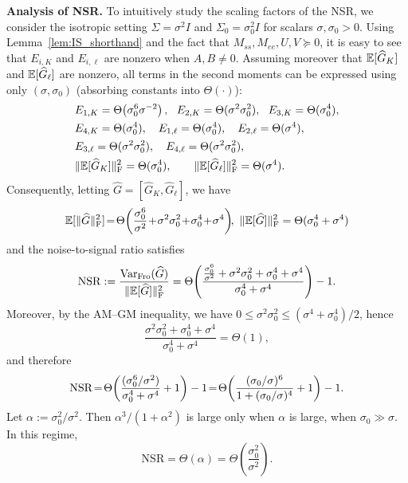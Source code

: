 \textbf{Analysis of NSR.}
To intuitively study the scaling factors of the NSR, we consider the isotropic setting $\Sigma=\sigma^2 I$ and $\Sigma_0=\sigma_0^2 I$ for scalars $\sigma,\sigma_0>0$.
Using Lemma~\ref{lem:IS_shorthand} and the fact that $M_{ss}, M_{ee}, U, V\succeq 0$, it is easy to see that $E_{i,K}$ and $E_{i,\ell}$ are nonzero when $A,B\neq 0$.
Assuming moreover that ${\mathbb{E}}[\widehat G_K]$ and ${\mathbb{E}}[\widehat G_\ell]$ are nonzero, all terms in the second moments can be expressed using only $(\sigma,\sigma_0)$ (absorbing constants into $\Theta(\cdot)$):
\begin{align*}
  &E_{1,K}=\Theta\!\left(\sigma_0^{6}\sigma^{-2}\right),\ \ 
  E_{2,K}=\Theta(\sigma^{2}\sigma_0^{2}),\ \ 
  E_{3,K}=\Theta(\sigma_0^{4}),\\
  &E_{4,K}=\Theta(\sigma_0^{4}),\quad
  E_{1,\ell}=\Theta(\sigma_0^{4}),\quad
  E_{2,\ell}=\Theta(\sigma^{4}),\\
  &E_{3,\ell}=\Theta(\sigma^{2}\sigma_0^{2}),\quad
  E_{4,\ell}=\Theta(\sigma^{2}\sigma_0^{2}),\\
  &\|\E[\widehat G_K]\|_{\mathrm F}^2=\Theta(\sigma_0^{4}),\qquad
  \|\E[\widehat G_\ell]\|_{\mathrm F}^2=\Theta(\sigma^{4}).
\end{align*}
Consequently, letting $\widehat G = [\widehat G_K, \widehat G_\ell]$, we have
\[
\E[\|\widehat G\|_{\mathrm F}^2]
\!=\!\Theta\!\left(\frac{\sigma_0^{6}}{\sigma^{2}}\!+\!\sigma^{2}\sigma_0^{2}\!+\!\sigma_0^{4}\!+\!\sigma^{4}\right)\!\!,
\
\|\E[\widehat G]\|_{\mathrm F}^2=\Theta(\sigma_0^{4}+\sigma^{4})
\]
and the noise-to-signal ratio satisfies
\[
\vspace{-2mm}
\mathrm{NSR}:=\frac{\VarF(\widehat G)}{\|\E[\widehat G]\|_{\mathrm F}^2}
=\Theta\!\left(\frac{\frac{\sigma_0^{6}}{\sigma^{2}}+\sigma^{2}\sigma_0^{2}+\sigma_0^{4}+\sigma^{4}}{\sigma_0^{4}+\sigma^{4}}\right)-1.
\]
Moreover, by the AM--GM inequality, we have $0\le \sigma^{2}\sigma_0^{2}\le (\sigma^{4}+\sigma_0^{4})/2$, hence
\[
\frac{\sigma^{2}\sigma_0^{2}+\sigma_0^{4}+\sigma^{4}}{\sigma_0^{4}+\sigma^{4}}=\Theta(1),
\]
and therefore
\[
\vspace{-2mm}
\mathrm{NSR}
\!=\!\Theta\!\left(\frac{(\sigma_0^{6}/\sigma^{2})}{\sigma_0^{4}+\sigma^{4}}+1\right)-1
\!=\!\Theta\!\left(\frac{(\sigma_0/\sigma)^{6}}{1+(\sigma_0/\sigma)^{4}}+1\right)-1.
\]
Let $\alpha:=\sigma_0^2/\sigma^2$. Then $\alpha^{3}/(1+\alpha^{2})$ is large only when $\alpha$ is large, \ie when $\sigma_0 \gg \sigma$. In this regime,
\begin{equation}\label{eq:lqr-nsr-scaling}
\mathrm{NSR}=\Theta(\alpha)=\Theta\!\left(\frac{\sigma_0^{2}}{\sigma^{2}}\right).
\end{equation}
